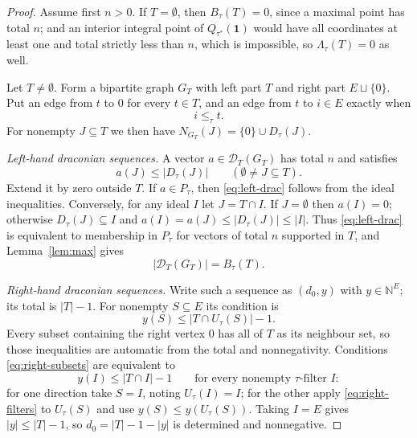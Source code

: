 \documentclass[11pt]{article}
\numberwithin{equation}{section}
\theoremstyle{definition}
\theoremstyle{remark}
\newcommand{\N}{\mathbb N}
\newcommand{\one}{\mathbf 1}
\newcommand{\Dr}{\mathcal D}
\begin{document}
\begin{proof}
Assume first $n>0$. If $T=\emptyset$, then $B_\tau(T)=0$, since a maximal
point has total $n$; and an interior integral point of $Q_{\tau^*}(\one)$
would have all coordinates at least one and total strictly less than $n$,
which is impossible, so $\Lambda_\tau(T)=0$ as well.

Let $T\ne\emptyset$. Form a bipartite graph $G_T$ with left part $T$ and right
part $E\sqcup\{0\}$. Put an edge from $t$ to $0$ for every $t\in T$, and an
edge from $t$ to $i\in E$ exactly when
\begin{equation}
 i\le_\tau t.
 \label{eq:GT-edge}
\end{equation}
For nonempty $J\subseteq T$ we then have $N_{G_T}(J)=\{0\}\cup D_\tau(J)$.

\smallskip\noindent\emph{Left-hand draconian sequences.}
A vector $a\in\Dr_T(G_T)$ has total $n$ and satisfies
\begin{equation}
 a(J)\le |D_\tau(J)|\qquad(\emptyset\ne J\subseteq T).
 \label{eq:left-drac}
\end{equation}
Extend it by zero outside $T$. If $a\in P_\tau$, then \eqref{eq:left-drac}
follows from the ideal inequalities. Conversely, for any ideal $I$ let
$J=T\cap I$. If $J=\emptyset$ then $a(I)=0$; otherwise $D_\tau(J)\subseteq I$
and $a(I)=a(J)\le|D_\tau(J)|\le|I|$. Thus \eqref{eq:left-drac} is equivalent
to membership in $P_\tau$ for vectors of total $n$ supported in $T$, and
Lemma~\ref{lem:max} gives
\begin{equation}
 |\Dr_T(G_T)|=B_\tau(T).
 \label{eq:left-identification}
\end{equation}

\smallskip\noindent\emph{Right-hand draconian sequences.}
Write such a sequence as $(d_0,y)$ with $y\in\N^E$; its total is $|T|-1$. For
nonempty $S\subseteq E$ its condition is
\begin{equation}
 y(S)\le |T\cap U_\tau(S)|-1.
 \label{eq:right-subsets}
\end{equation}
Every subset containing the right vertex $0$ has all of $T$ as its neighbour
set, so those inequalities are automatic from the total and nonnegativity.
Conditions \eqref{eq:right-subsets} are equivalent to
\begin{equation}
 y(I)\le |T\cap I|-1
 \qquad\text{for every nonempty $\tau$-filter }I:
 \label{eq:right-filters}
\end{equation}
for one direction take $S=I$, noting $U_\tau(I)=I$; for the other apply
\eqref{eq:right-filters} to $U_\tau(S)$ and use $y(S)\le y(U_\tau(S))$. Taking
$I=E$ gives $|y|\le|T|-1$, so $d_0=|T|-1-|y|$ is determined and nonnegative.


\end{proof}
\end{document}
